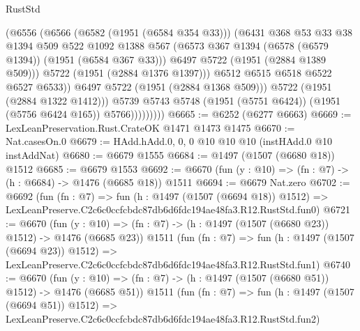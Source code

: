 \begin{lexlean}{RustStd}
\begin{coremodule}
                            (@6556
                              (@6566
                                (@6582 (@1951 (@6584 @354 @33)))
                                (@6431
                                  @368
                                  @53
                                  @33
                                  @38
                                  @1394
                                  @509
                                  @522
                                  @1092
                                  @1388
                                  @567
                                  (@6573 @367 @1394 (@6578 (@6579 @1394)) (@1951 (@6584 @367 @33)))
                                  @6497
                                  @5722
                                  (@1951 (@2884 @1389 @509)))
                                @5722
                                (@1951 (@2884 @1376 @1397)))
                              @6512
                              @6515
                              @6518
                              @6522
                              @6527
                              @6533))
                          @6497
                          @5722
                          (@1951 (@2884 @1368 @509)))
                        @5722
                        (@1951 (@2884 @1322 @1412)))
                      @5739
                      @5743
                      @5748
                      (@1951 (@5751 @6424))
                      (@1951 (@5756 @6424 @165))
                      @5766)))))))))
@6665 := @6252 (@6277 @6663)
@6669 := LexLeanPreservation.Rust.CrateOK @1471 @1473 @1475
@6670 := Nat.casesOn.{0}
@6679 := HAdd.hAdd.{0, 0, 0} @10 @10 @10 (instHAdd.{0} @10 instAddNat)
@6680 := @6679 @1555
@6684 := @1497 (@1507 (@6680 @18)) @1512
@6685 := @6679 @1553
@6692 := @6670 (fun (y : @10) => (fn : @7) -> (h : @6684) -> @1476 (@6685 @18)) @1511
@6694 := @6679 Nat.zero
@6702 := @6692
    (fun (fn : @7) =>
    fun (h : @1497 (@1507 (@6694 @18)) @1512) =>
    LexLeanPreserve.C2c6c0ccfcbdc87db6d6fdc194ae48fa3.R12.RustStd.fun0)
@6721 := @6670
    (fun (y : @10) => (fn : @7) -> (h : @1497 (@1507 (@6680 @23)) @1512) -> @1476 (@6685 @23))
    @1511
    (fun (fn : @7) =>
    fun (h : @1497 (@1507 (@6694 @23)) @1512) =>
    LexLeanPreserve.C2c6c0ccfcbdc87db6d6fdc194ae48fa3.R12.RustStd.fun1)
@6740 := @6670
    (fun (y : @10) => (fn : @7) -> (h : @1497 (@1507 (@6680 @51)) @1512) -> @1476 (@6685 @51))
    @1511
    (fun (fn : @7) =>
    fun (h : @1497 (@1507 (@6694 @51)) @1512) =>
    LexLeanPreserve.C2c6c0ccfcbdc87db6d6fdc194ae48fa3.R12.RustStd.fun2)

\end{coremodule}
\end{lexlean}
